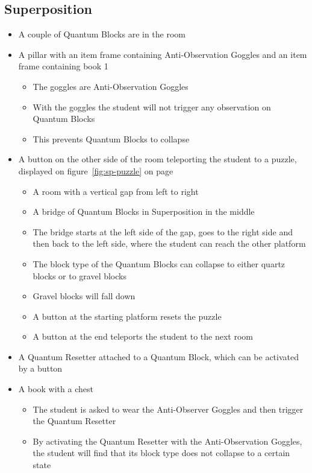 \documentclass[11pt,twoside]{report} %
\begin{document}
\subsection{Superposition}

\begin{itemize}
	\item A couple of Quantum Blocks are in the room
	\item A pillar with an item frame containing Anti-Observation Goggles and an item frame containing book 1
	\begin{itemize}
		\item The goggles are Anti-Observation Goggles
		\item With the goggles the student will not trigger any observation on Quantum Blocks
		\item This prevents Quantum Blocks to collapse
	\end{itemize}
	\item A button on the other side of the room teleporting the student to a puzzle, displayed on figure~\ref{fig:sp-puzzle} on page~\pageref{fig:sp-puzzle}
	\begin{itemize}
		\item A room with a vertical gap from left to right
		\item A bridge of Quantum Blocks in Superposition in the middle
		\item The bridge starts at the left side of the gap, goes to the right side and then back to the left side, where the student can reach the other platform
		\item The block type of the Quantum Blocks can collapse to either quartz blocks or to gravel blocks
		\item Gravel blocks will fall down
		\item A button at the starting platform resets the puzzle
		\item A button at the end teleports the student to the next room
	\end{itemize}
	\item A Quantum Resetter attached to a Quantum Block, which can be activated by a button
	\item A book with a chest
	\begin{itemize}
		\item The student is asked to wear the Anti-Observer Goggles and then trigger the Quantum Resetter
		\item By activating the Quantum Resetter with the Anti-Observation Goggles, the student will find that its block type does not collapse to a certain state

\end{itemize}
\end{itemize}
\end{document}
